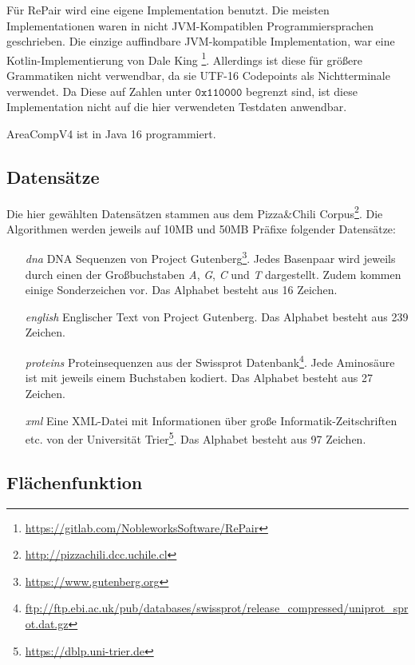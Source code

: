 Für RePair wird eine eigene Implementation benutzt. Die meisten Implementationen waren in nicht JVM-Kompatiblen Programmiersprachen geschrieben. 
Die einzige auffindbare JVM-kompatible Implementation, war eine Kotlin-Implementierung von Dale King \footnote{\url{https://gitlab.com/NobleworksSoftware/RePair}}. Allerdings ist diese für größere Grammatiken nicht verwendbar, da sie UTF-16 Codepoints als Nichtterminale verwendet. Da Diese auf Zahlen unter $\mathtt{0x110000}$ begrenzt sind, ist diese Implementation nicht auf die hier verwendeten Testdaten anwendbar.

AreaCompV4 ist in Java 16 programmiert.

\subsection{Datensätze}

Die hier gewählten Datensätzen stammen aus dem Pizza\&Chili Corpus\footnote{\url{http://pizzachili.dcc.uchile.cl}}. Die Algorithmen werden jeweils auf 10MB und 50MB Präfixe folgender Datensätze:

\begin{itemize}
    \item[\emph{dna}] DNA Sequenzen von Project Gutenberg\footnote{\label{footnotegutenberg}\url{https://www.gutenberg.org}}. Jedes Basenpaar wird jeweils durch einen der Großbuchstaben \emph{A}, \emph{G}, \emph{C} und \emph{T} dargestellt. Zudem kommen einige Sonderzeichen vor. Das Alphabet besteht aus 16 Zeichen.
    \item[\emph{english}] Englischer Text von Project Gutenberg. Das Alphabet besteht aus 239 Zeichen.
    \item[\emph{proteins}] Proteinsequenzen aus der Swissprot Datenbank\footnote{\url{ftp://ftp.ebi.ac.uk/pub/databases/swissprot/release_compressed/uniprot_sprot.dat.gz}}. Jede Aminosäure ist mit jeweils einem Buchstaben kodiert. Das Alphabet besteht aus 27 Zeichen.
    \item[\emph{xml}] Eine XML-Datei mit Informationen über große Informatik-Zeitschriften etc. von der Universität Trier\footnote{\url{https://dblp.uni-trier.de}}. Das Alphabet besteht aus 97 Zeichen.
\end{itemize}

\subsection{Flächenfunktion}

